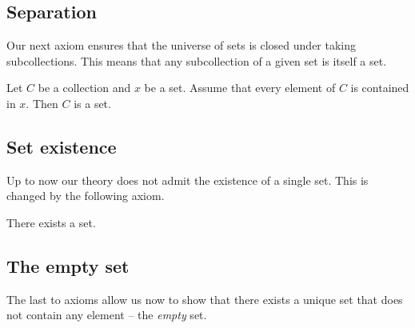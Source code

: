\documentclass[../../set-theory.tex]{subfiles}
\begin{document}
  \subsection{Separation}

  \noindent Our next axiom ensures that the universe of sets is closed under
  taking subcollections.
  This means that any subcollection of a given set is itself a set.

  \begin{forthel}
    \begin{axiom}[Separation]\label{SetTheory_01_01_240572}
      Let $C$ be a collection and $x$ be a set.
      Assume that every element of $C$ is contained in $x$.
      Then $C$ is a set.
    \end{axiom}
  \end{forthel}


  \subsection{Set existence}

  \noindent Up to now our theory does not admit the existence of a single set.
  This is changed by the following axiom.

  \begin{forthel}
    \begin{axiom}\label{SetTheory_01_01_559689}
      There exists a set.
    \end{axiom}
  \end{forthel}


  \subsection{The empty set}

  \noindent The last to axioms allow us now to show that there exists a unique
  set that does not contain any element -- the \textit{empty} set.
\end{document}
